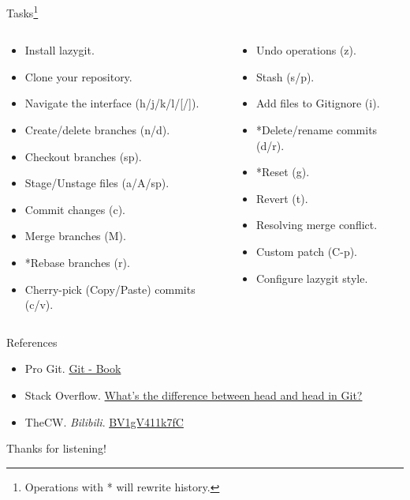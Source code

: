 \documentclass[aspectratio=169]{beamer}
\begin{document}
\begin{frame}{Tasks\footnote{Operations with * will rewrite history.}}
    \begin{columns}
        \begin{column}{0.6\textwidth}
            \begin{itemize}
                \item Install lazygit.
                \item Clone your repository.
                \item Navigate the interface (h/j/k/l/[/]).
                \item Create/delete branches (n/d).
                \item Checkout branches (sp).
                \item Stage/Unstage files (a/A/sp).
                \item Commit changes (c).
                \item Merge branches (M).
                \item *Rebase branches (r).
                \item Cherry-pick (Copy/Paste) commits (c/v).
            \end{itemize}
        \end{column}
        \begin{column}{0.5\textwidth}
            \begin{itemize}
                \item Undo operations (z).
                \item Stash (s/p).
                \item Add files to Gitignore (i).
                \item *Delete/rename commits (d/r).
                \item *Reset (g).
                \item Revert (t).
                \item Resolving merge conflict.
                \item Custom patch (C-p).
                \item Configure lazygit style.
            \end{itemize}
        \end{column}
    \end{columns}
\end{frame}

\begin{frame}{References}
    \begin{itemize}
        \item Pro Git. \href{https://git-scm.com/book/en/v2}{Git - Book}
        \item Stack Overflow. \href{https://stackoverflow.com/questions/2221658/whats-the-difference-between-head-and-head-in-git}{What's the difference between head and head in Git?}
        \item TheCW. \emph{Bilibili}. \href{https://www.bilibili.com/video/BV1gV411k7fC}{BV1gV411k7fC}
    \end{itemize}
\end{frame}

\begin{frame}
    \Huge{\textcolor{UMBlue}{Thanks for listening!}}
\end{frame}
\end{document}
